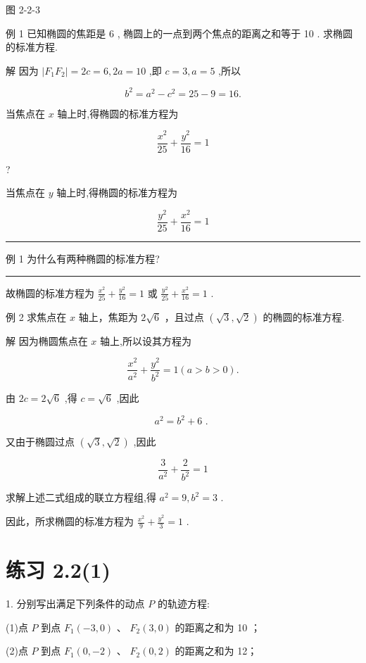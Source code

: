 \documentclass[10pt]{article}
\newcommand{\HRule}{\begin{center}\rule{0.9\linewidth}{0.2mm}\end{center}}
\begin{document}
图 2-2-3

例 1 已知椭圆的焦距是 6 , 椭圆上的一点到两个焦点的距离之和等于 10 . 求椭圆的标准方程.

解 因为 \(\left| {{F}_{1}{F}_{2}}\right|  = {2c} = 6,{2a} = {10}\) ,即 \(c = 3,a = 5\) ,所以

\[
{b}^{2} = {a}^{2} - {c}^{2} = {25} - 9 = {16}.
\]

当焦点在 \(x\) 轴上时,得椭圆的标准方程为

\[
\frac{{x}^{2}}{25} + \frac{{y}^{2}}{16} = 1
\]

?

当焦点在 \(y\) 轴上时,得椭圆的标准方程为

\[
\frac{{y}^{2}}{25} + \frac{{x}^{2}}{16} = 1
\]

\HRule

例 1 为什么有两种椭圆的标准方程?

\HRule

故椭圆的标准方程为 \(\frac{{x}^{2}}{25} + \frac{{y}^{2}}{16} = 1\) 或 \(\frac{{y}^{2}}{25} + \frac{{x}^{2}}{16} = 1\) .

例 2 求焦点在 \(x\) 轴上，焦距为 \(2\sqrt{6}\) ，且过点 \(\left( {\sqrt{3},\sqrt{2}}\right)\) 的椭圆的标准方程.

解 因为椭圆焦点在 \(x\) 轴上,所以设其方程为

\[
\frac{{x}^{2}}{{a}^{2}} + \frac{{y}^{2}}{{b}^{2}} = 1\left( {a > b > 0}\right) .
\]

由 \({2c} = 2\sqrt{6}\) ,得 \(c = \sqrt{6}\) ,因此

\[
{a}^{2} = {b}^{2} + 6\text{ . }
\]

又由于椭圆过点 \(\left( {\sqrt{3},\sqrt{2}}\right)\) ,因此

\[
\frac{3}{{a}^{2}} + \frac{2}{{b}^{2}} = 1
\]

求解上述二式组成的联立方程组,得 \({a}^{2} = 9,{b}^{2} = 3\) .

因此，所求椭圆的标准方程为 \(\frac{{x}^{2}}{9} + \frac{{y}^{2}}{3} = 1\) .

\section*{练习 2.2(1)}

1. 分别写出满足下列条件的动点 \(P\) 的轨迹方程:

(1)点 \(P\) 到点 \({F}_{1}\left( {-3,0}\right)\) 、 \({F}_{2}\left( {3,0}\right)\) 的距离之和为 10 ；

(2)点 \(P\) 到点 \({F}_{1}\left( {0, - 2}\right)\) 、 \({F}_{2}\left( {0,2}\right)\) 的距离之和为 12；
\end{document}
